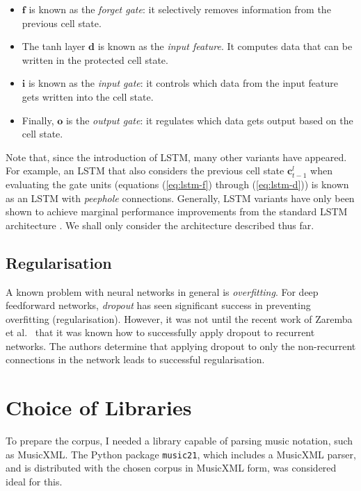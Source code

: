 \documentclass[12pt,a4paper,twoside,openright]{report}
\newcommand{\vect}[1]{\boldsymbol{\mathbf{#1}}}
\begin{document}
\begin{itemize}
  \item $\vect{f}$ is known as the \emph{forget gate}: it selectively removes
    information from the previous cell state.
  \item The tanh layer $\vect{d}$ is known as the \emph{input feature}. It
    computes data that can be written in the protected cell state.
\item $\vect{i}$ is known as the \emph{input gate}: it controls which data from
  the input feature gets written into the cell state.
\item Finally, $\vect{o}$ is the \emph{output gate}: it regulates which data
  gets output based on the cell state.
\end{itemize}

Note that, since the introduction of LSTM, many other variants have appeared.
For example, an LSTM that also considers the previous cell state
$\vect{c}_{t-1}^l$ when evaluating the gate units (equations (\ref{eq:lstm-f})
through (\ref{eq:lstm-d})) is known as an LSTM with \emph{peephole} connections.
Generally, LSTM variants have only been shown to achieve marginal performance
improvements from the standard LSTM architecture \cite{greff2016lstm}. We shall
only consider the architecture described thus far.

\subsection{Regularisation}

A known problem with neural networks in general is \emph{overfitting}. For deep
feedforward networks, \emph{dropout} \cite{srivastava2014dropout} has seen
significant success in preventing overfitting (regularisation). However, it was
not until the recent work of Zaremba et al.\ \cite{zaremba2014recurrent} that it
was known how to successfully apply dropout to recurrent networks. The authors
determine that applying dropout to only the non-recurrent connections in the
network leads to successful regularisation. 

\section{Choice of Libraries}

To prepare the corpus, I needed a library capable of parsing music notation,
such as MusicXML. The Python package \texttt{music21}, which includes a MusicXML
parser, and is distributed with the chosen corpus in MusicXML form, was
considered ideal for this. 
\end{document}
